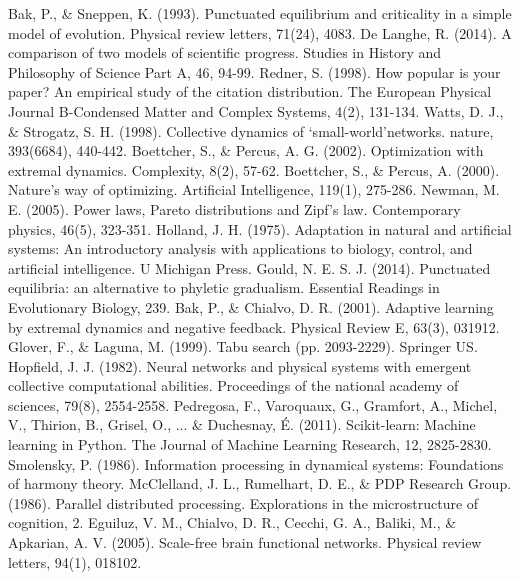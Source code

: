 \documentclass[12pt]{article}
\begin{document}
\begin{thebibliography}[99]
    Bak, P., \& Sneppen, K. (1993). Punctuated equilibrium and criticality in a simple model of evolution. Physical review letters, 71(24), 4083.
    De Langhe, R. (2014). A comparison of two models of scientific progress. Studies in History and Philosophy of Science Part A, 46, 94-99.
    Redner, S. (1998). How popular is your paper? An empirical study of the citation distribution. The European Physical Journal B-Condensed Matter and Complex Systems, 4(2), 131-134.
    Watts, D. J., \& Strogatz, S. H. (1998). Collective dynamics of ‘small-world’networks. nature, 393(6684), 440-442.
    Boettcher, S., \& Percus, A. G. (2002). Optimization with extremal dynamics. Complexity, 8(2), 57-62.
    Boettcher, S., \& Percus, A. (2000). Nature's way of optimizing. Artificial Intelligence, 119(1), 275-286.
    Newman, M. E. (2005). Power laws, Pareto distributions and Zipf's law. Contemporary physics, 46(5), 323-351.
    Holland, J. H. (1975). Adaptation in natural and artificial systems: An introductory analysis with applications to biology, control, and artificial intelligence. U Michigan Press.
    Gould, N. E. S. J. (2014). Punctuated equilibria: an alternative to phyletic gradualism. Essential Readings in Evolutionary Biology, 239.
    Bak, P., \& Chialvo, D. R. (2001). Adaptive learning by extremal dynamics and negative feedback. Physical Review E, 63(3), 031912.
    Glover, F., \& Laguna, M. (1999). Tabu search (pp. 2093-2229). Springer US.
    Hopfield, J. J. (1982). Neural networks and physical systems with emergent collective computational abilities. Proceedings of the national academy of sciences, 79(8), 2554-2558.
    Pedregosa, F., Varoquaux, G., Gramfort, A., Michel, V., Thirion, B., Grisel, O., ... \& Duchesnay, É. (2011). Scikit-learn: Machine learning in Python. The Journal of Machine Learning Research, 12, 2825-2830.
    Smolensky, P. (1986). Information processing in dynamical systems: Foundations of harmony theory.
    McClelland, J. L., Rumelhart, D. E., \& PDP Research Group. (1986). Parallel distributed processing. Explorations in the microstructure of cognition, 2.
    Eguiluz, V. M., Chialvo, D. R., Cecchi, G. A., Baliki, M., \& Apkarian, A. V. (2005). Scale-free brain functional networks. Physical review letters, 94(1), 018102.

\end{thebibliography}
\end{document}
